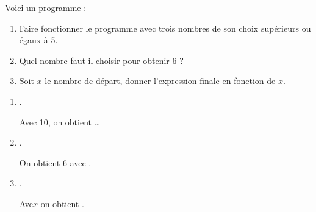 \begin{Maquette}[Fiche,CorrigeFin,Colonnes=2]{}
\begin{multicols}{2}
      \begin{Solution}
      \end{Solution}
      
      
      \begin{exercice} %
         Voici un programme :
         \begin{center}
         \end{center}
         \begin{enumerate}
            \item Faire fonctionner le programme avec trois nombres de son choix supérieurs ou égaux à 5.
            \item Quel nombre faut-il choisir pour obtenir 6 ?
            \item Soit $x$ le nombre de départ, donner l'expression finale en fonction de $x$.
         \end{enumerate}
      \end{exercice}
      
      \begin{Solution}
         \begin{enumerate}
            \item {}. \par
               Avec 10, on obtient  \dots
            \item {}. \par
               On obtient 6 avec .
            \item {}. \par
               Ave$x$ on obtient .
         \end{enumerate}
      \end{Solution}


\end{multicols}
\end{Maquette}
